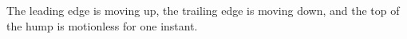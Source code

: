The leading edge is moving up, the trailing edge is moving down, and
the top of the hump is motionless for one instant.
